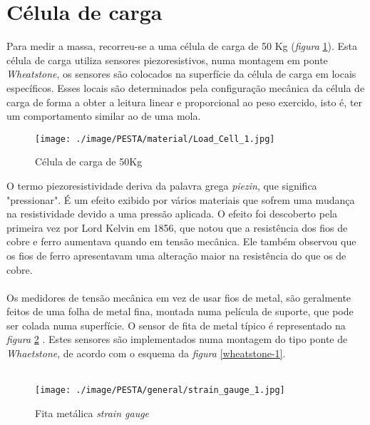 \section{Célula de carga}
Para medir a massa, recorreu-se a uma célula de carga de 50 Kg (\textit{figura} \ref{Load_Cell_1}). Esta célula de carga utiliza sensores piezoresistivos, numa montagem em ponte \textit{Wheatstone}, os sensores são colocados na superfície da célula de carga em locais específicos. Esses locais são determinados pela configuração mecânica da célula de carga de forma a obter a leitura linear e proporcional ao peso exercido, isto é, ter um comportamento similar ao de uma mola.
\\
\begin{figure}[H]
	\centering
	\texttt{[image: ./image/PESTA/material/Load\_Cell\_1.jpg]}
	\caption{Célula de carga de 50Kg}
	\label{Load_Cell_1}
\end{figure}
O termo piezoresistividade deriva da palavra grega \textit{piezin}, que significa "pressionar". É um efeito exibido por vários materiais que sofrem uma mudança na resistividade devido a uma pressão aplicada. O efeito foi descoberto pela primeira vez por Lord Kelvin em 1856, que notou que a resistência dos fios de cobre e ferro aumentava quando em tensão mecânica. Ele também observou que os fios de ferro apresentavam uma alteração maior na resistência do que os de cobre. 
\\
\\
Os medidores de tensão mecânica em vez de usar fios de metal, são geralmente feitos de uma folha de metal fina, montada numa película de suporte, que pode ser colada numa superfície. O sensor de fita de metal típico é representado na \textit{figura} \ref{strain_gauge_1} \cite{book-9}.
Estes sensores são implementados numa montagem do tipo ponte de \textit{Whaetstone}, de acordo com o esquema da \textit{figura} \ref{wheatstone-1}.
\\
\\
\begin{minipage}[!b]{.6\linewidth}
\begin{figure}[H]
	\captionsetup{justification=raggedright,singlelinecheck=false}
	\flushleft
	\texttt{[image: ./image/PESTA/general/strain\_gauge\_1.jpg]}
	\caption{Fita metálica \textit{strain gauge} \cite{book-9}}
	\label{strain_gauge_1}
\end{figure}
\end{minipage}

